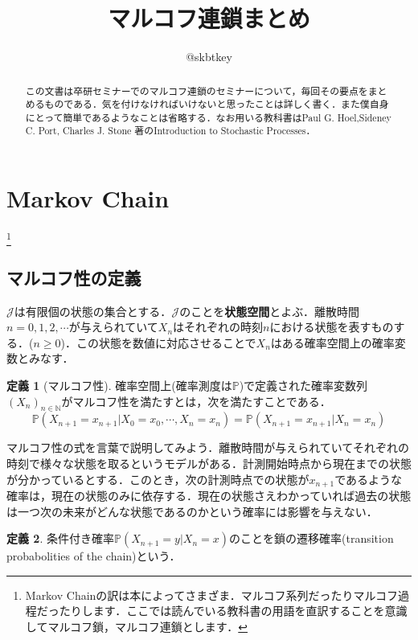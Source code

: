 \documentclass[12pt, a4paper]{jsarticle}
\title{マルコフ連鎖まとめ}
\author{@skbtkey}
\date{}
\theoremstyle{definition}
\newtheorem{defn}{定義}[section]
\newcommand{\NN}{{\mathbb{N}}} %
\begin{document}
\maketitle
\begin{abstract}
この文書は卒研セミナーでのマルコフ連鎖のセミナーについて，毎回その要点をまとめるものである．気を付けなければいけないと思ったことは詳しく書く．また僕自身にとって簡単であるようなことは省略する．なお用いる教科書はPaul G. Hoel,Sideney C. Port, Charles J. Stone 著のIntroduction to Stochastic Processes．
\end{abstract}

\section{Markov Chain}\footnote{Markov Chainの訳は本によってさまざま．マルコフ系列だったりマルコフ過程だったりします．ここでは読んでいる教科書の用語を直訳することを意識してマルコフ鎖，マルコフ連鎖とします．}

\subsection{マルコフ性の定義}
$\mathcal{J}$は有限個の状態の集合とする．$\mathcal{J}$のことを{\bf 状態空間}とよぶ．離散時間$n = 0,1,2,\cdots$が与えられていて$X_n$はそれぞれの時刻$n$における状態を表すものする．($n \ge 0$)．この状態を数値に対応させることで$X_n$はある確率空間上の確率変数とみなす．
\begin{screen}
	\begin{defn}[マルコフ性]
		確率空間上(確率測度は$\mathbb{P}$)で定義された確率変数列$(X_n)_{n \in \NN}$がマルコフ性を満たすとは，次を満たすことである．
\begin{equation}
\mathbb{P}(X_{n+1} = x_{n+1} | X_0 = x_0 , \cdots , X_n = x_n) = \mathbb{P}(X_{n+1} = x_{n+1} | X_n = x_n) \label{markov property}
\end{equation}
	\end{defn}
\end{screen}

マルコフ性の式を言葉で説明してみよう．離散時間が与えられていてそれぞれの時刻で様々な状態を取るというモデルがある．計測開始時点から現在までの状態が分かっているとする．このとき，次の計測時点での状態が$x_{n+1}$であるような確率は，現在の状態のみに依存する．現在の状態さえわかっていれば過去の状態は一つ次の未来がどんな状態であるのかという確率には影響を与えない．

\begin{screen}
	\begin{defn}
		条件付き確率$\mathbb{P}(X_{n+1} = y | X_n = x)$のことを鎖の遷移確率(transition probabolities of the chain)という．
	\end{defn}
\end{screen}
\end{document}
